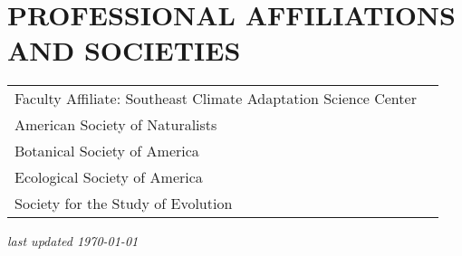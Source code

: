 \documentclass[11pt,english]{article}\usepackage[]{graphicx}\usepackage[]{xcolor}
\providecommand{\tabularnewline}{\\}
\begin{document}

\section*{PROFESSIONAL AFFILIATIONS AND SOCIETIES}

\renewcommand{\arraystretch}{1.2}
\begin{tabularx}{\textwidth}{@{}>{\raggedright}p{5.25in} >{\raggedleft}X@{}}
Faculty Affiliate: Southeast Climate Adaptation Science Center \tabularnewline
American Society of Naturalists \tabularnewline
Botanical Society of America \tabularnewline
Ecological Society of America \tabularnewline
Society for the Study of Evolution \tabularnewline
\end{tabularx}
\vfill
\begin{center}
\textit{last updated \today}
\end{center}
\end{document}
